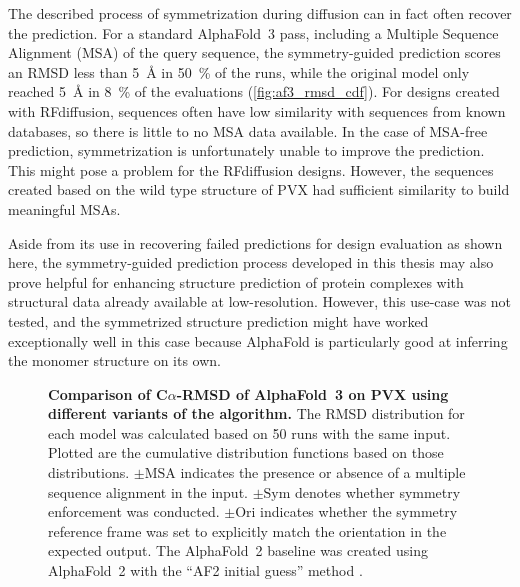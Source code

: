 The described process of symmetrization during diffusion can in fact often recover the prediction. For a standard AlphaFold~3 pass, including a Multiple Sequence Alignment (MSA) of the query sequence, the symmetry-guided prediction scores an RMSD less than \SI{5}{\angstrom} in \SI{50}{\percent} of the runs, while the original model only reached \SI{5}{\angstrom} in \SI{8}{\percent} of the evaluations (\autoref{fig:af3_rmsd_cdf}). For designs created with RFdiffusion, sequences often have low similarity with sequences from known databases, so there is little to no MSA data available. In the case of MSA-free prediction, symmetrization is unfortunately unable to improve the prediction. This might pose a problem for the RFdiffusion designs. However, the sequences created based on the wild type structure of PVX had sufficient similarity to build meaningful MSAs. 

Aside from its use in recovering failed predictions for design evaluation as shown here, the symmetry-guided prediction process developed in this thesis may also prove helpful for enhancing structure prediction of protein complexes with structural data already available at low-resolution. However, this use-case was not tested, and the symmetrized structure prediction might have worked exceptionally well in this case because AlphaFold is particularly good at inferring the monomer structure on its own.

\begin{figure}

\caption{\textbf{Comparison of C$\alpha$-RMSD of AlphaFold~3 on PVX using different variants of the algorithm. } The RMSD distribution for each model was calculated based on 50 runs with the same input. Plotted are the cumulative distribution functions based on those distributions. $\pm\text{MSA}$ indicates the presence or absence of a multiple sequence alignment in the input. $\pm\text{Sym}$ denotes whether symmetry enforcement was conducted. $\pm\text{Ori}$ indicates whether the symmetry reference frame was set to explicitly match the orientation in the expected output. The AlphaFold~2 baseline was created using AlphaFold~2 with the ``AF2 initial guess'' method \cite{binder_design}. } 
\label{fig:af3_rmsd_cdf}
\end{figure}

